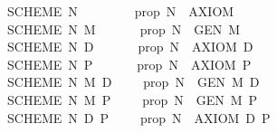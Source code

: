 \begin{isabellebody}
\isanewline
{}\isamarkupfalse%
\isanewline
\ \ {\isachardoublequoteopen}{\isacharunderscore}SCHEME{}\ N{\isachardoublequoteclose}\ \ \ \ \ \ \ \ {\isacharequal}{\isacharequal}\ {\isacharparenleft}{\isachardoublequoteopen}prop{\isachardoublequoteclose}{\isacharparenright}\ {\isachardoublequoteopen}N\ {\isacharequal}{\isacharequal}\ {\isacharunderscore}AXIOM{}{\isachardoublequoteclose}\ \isanewline
\ \ {\isachardoublequoteopen}{\isacharunderscore}SCHEME{}\ N\ M{\isachardoublequoteclose}\ \ \ \ \ \ {\isacharequal}{\isacharequal}\ {\isacharparenleft}{\isachardoublequoteopen}prop{\isachardoublequoteclose}{\isacharparenright}\ {\isachardoublequoteopen}N\ {\isacharequal}{\isacharequal}\ {\isacharparenleft}{\isacharunderscore}GEN{}\ M{\isacharparenright}{\isachardoublequoteclose}\ \ \isanewline
\ \ {\isachardoublequoteopen}{\isacharunderscore}SCHEME{}\ N\ D{\isachardoublequoteclose}\ \ \ \ \ \ {\isacharequal}{\isacharequal}\ {\isacharparenleft}{\isachardoublequoteopen}prop{\isachardoublequoteclose}{\isacharparenright}\ {\isachardoublequoteopen}N\ {\isacharequal}{\isacharequal}\ {\isacharparenleft}{\isacharunderscore}AXIOM{}\ D{\isacharparenright}{\isachardoublequoteclose}\isanewline
\ \ {\isachardoublequoteopen}{\isacharunderscore}SCHEME{}\ N\ P{\isachardoublequoteclose}\ \ \ \ \ \ {\isacharequal}{\isacharequal}\ {\isacharparenleft}{\isachardoublequoteopen}prop{\isachardoublequoteclose}{\isacharparenright}\ {\isachardoublequoteopen}N\ {\isacharequal}{\isacharequal}\ {\isacharparenleft}{\isacharunderscore}AXIOM{}\ P{\isacharparenright}{\isachardoublequoteclose}\isanewline
\ \ {\isachardoublequoteopen}{\isacharunderscore}SCHEME{}\ N\ M\ D{\isachardoublequoteclose}\ \ \ \ {\isacharequal}{\isacharequal}\ {\isacharparenleft}{\isachardoublequoteopen}prop{\isachardoublequoteclose}{\isacharparenright}\ {\isachardoublequoteopen}N\ {\isacharequal}{\isacharequal}\ {\isacharparenleft}{\isacharunderscore}GEN{}\ M\ D{\isacharparenright}{\isachardoublequoteclose}\ \isanewline
\ \ {\isachardoublequoteopen}{\isacharunderscore}SCHEME{}\ N\ M\ P{\isachardoublequoteclose}\ \ \ \ {\isacharequal}{\isacharequal}\ {\isacharparenleft}{\isachardoublequoteopen}prop{\isachardoublequoteclose}{\isacharparenright}\ {\isachardoublequoteopen}N\ {\isacharequal}{\isacharequal}\ {\isacharparenleft}{\isacharunderscore}GEN{}\ M\ P{\isacharparenright}{\isachardoublequoteclose}\ \isanewline
\ \ {\isachardoublequoteopen}{\isacharunderscore}SCHEME{}\ N\ D\ P{\isachardoublequoteclose}\ \ \ \ {\isacharequal}{\isacharequal}\ {\isacharparenleft}{\isachardoublequoteopen}prop{\isachardoublequoteclose}{\isacharparenright}\ {\isachardoublequoteopen}N\ {\isacharequal}{\isacharequal}\ {\isacharparenleft}{\isacharunderscore}AXIOM{}\ D\ P{\isacharparenright}{\isachardoublequoteclose}\isanewline

\end{isabellebody}
